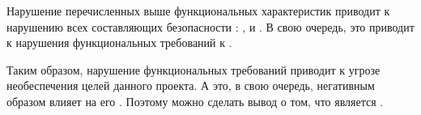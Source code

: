 %
Нарушение перечисленных выше функциональных характеристик приводит к нарушению всех составляющих безопасности : ,  и . 
%
В свою очередь, это приводит к  нарушения функциональных требований к .

%
Таким образом, нарушение функциональных требований  приводит к угрозе необеспечения целей данного проекта. 
%
А это, в свою очередь, негативным образом влияет на его . 
%
Поэтому можно сделать вывод о том, что  является  . 